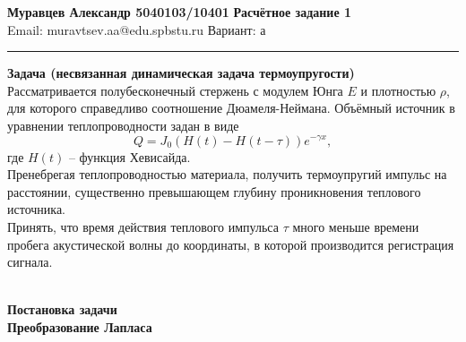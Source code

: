 \documentclass[a4paper, 11pt]{article}
\newenvironment{problem}[2][Problem]
    { \begin{mdframed}[backgroundcolor=gray!10] \textbf{#1 #2} \\}
    {  \end{mdframed}}
\newenvironment{solution}
    {\textit{}}
    {}
\begin{document}
\large\textbf{Муравцев Александр 5040103/10401} \hfill \textbf{Расчётное задание 1}   \\
Email: muravtsev.aa@edu.spbstu.ru \hfill Вариант: а \\
\rule{7in}{2.8pt}

\begin{problem}[Задача]{(несвязанная динамическая задача термоупругости)}
 
 Рассматривается полубесконечный стержень с модулем Юнга $E$ и плотностью $\rho$, для которого справедливо соотношение Дюамеля-Неймана. Объёмный источник в уравнении теплопроводности задан в виде
 $$
 	Q=J_0(H(t)-H(t-\tau))e^{-\gamma x},
 $$
 где $H(t)$ -- функция Хевисайда.\\
 
 Пренебрегая теплопроводностью материала, получить термоупругий импульс на расстоянии, существенно превышающем глубину проникновения теплового источника.\\
 
 Принять, что время действия теплового импульса $\tau$ много меньше времени пробега акустической волны до координаты, в которой производится регистрация сигнала.

\end{problem}
\begin{solution}\\
\textbf{Постановка задачи}\\
\textbf{Преобразование Лапласа}

\end{solution}
\end{document}
